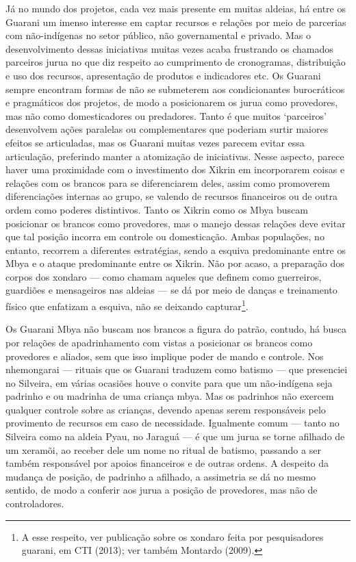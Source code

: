 \documentclass{article}
\begin{document}
J\'a no mundo dos projetos, cada vez mais presente em muitas aldeias,
h\'a entre os Guarani um imenso interesse em captar recursos e
rela\c{c}\~oes por meio de parcerias com n\~ao-ind\'igenas no setor
p\'ublico, n\~ao governamental e privado. Mas o desenvolvimento dessas
iniciativas muitas vezes acaba frustrando os chamados parceiros jurua
no que diz respeito ao cumprimento de cronogramas, distribui\c{c}\~ao e
uso dos recursos, apresenta\c{c}\~ao de produtos e indicadores etc. Os
Guarani sempre encontram formas de n\~ao se submeterem aos
condicionantes burocr\'aticos e pragm\'aticos dos projetos, de modo a
posicionarem os jurua como provedores, mas n\~ao como domesticadores ou
predadores. Tanto \'e que muitos
{\textquoteleft}parceiros{\textquoteright} desenvolvem a\c{c}\~oes
paralelas ou complementares que poderiam surtir maiores efeitos se
articuladas, mas os Guarani muitas vezes parecem evitar essa
articula\c{c}\~ao, preferindo manter a atomiza\c{c}\~ao de iniciativas.
Nesse aspecto, parece haver uma proximidade com o investimento dos
Xikrin em incorporarem coisas e rela\c{c}\~oes com os brancos para se
diferenciarem deles, assim como promoverem diferencia\c{c}\~oes
internas ao grupo, se valendo de recursos financeiros ou de outra ordem
como poderes distintivos. Tanto os Xikrin como os Mbya buscam
posicionar os brancos como provedores, mas o manejo dessas
rela\c{c}\~oes deve evitar que tal posi\c{c}\~ao incorra em controle ou
domestica\c{c}\~ao. Ambas popula\c{c}\~oes, no entanto, recorrem a
diferentes estrat\'egias, sendo a esquiva predominante entre os Mbya e
o ataque predominante entre os Xikrin. N\~ao por acaso, a
prepara\c{c}\~ao dos corpos dos xondaro --- como chamam aqueles que
definem como guerreiros, guardi\~oes e mensageiros nas aldeias --- se
d\'a por meio de dan\c{c}as e treinamento f\'isico que enfatizam a
esquiva, n\~ao se deixando capturar\footnote{ A esse respeito, ver
publica\c{c}\~ao sobre os xondaro feita por pesquisadores guarani, em
CTI (2013); ver tamb\'em Montardo (2009).}.

Os Guarani Mbya n\~ao buscam nos brancos a figura do patr\~ao, contudo,
h\'a busca por rela\c{c}\~oes de apadrinhamento com vistas a posicionar
os brancos como provedores e aliados, sem que isso implique poder de
mando e controle. Nos nhemongarai --- rituais que os Guarani traduzem
como batismo --- que presenciei no Silveira, em v\'arias ocasi\~oes
houve o convite para que um n\~ao-ind\'igena seja padrinho e ou
madrinha de uma crian\c{c}a mbya. Mas os padrinhos n\~ao exercem
qualquer controle sobre as crian\c{c}as, devendo apenas serem
respons\'aveis pelo provimento de recursos em caso de necessidade.
Igualmente comum --- tanto no Silveira como na aldeia Pyau, no
Jaragu\'a --- \'e que um jurua se torne afilhado de um xeram\~oi, ao
receber dele um nome no ritual de batismo, passando a ser tamb\'em
respons\'avel por apoios financeiros e de outras ordens. A despeito da
mudan\c{c}a de posi\c{c}\~ao, de padrinho a afilhado, a assimetria se
d\'a no mesmo sentido, de modo a conferir aos jurua a posi\c{c}\~ao de
provedores, mas n\~ao de controladores.
\end{document}
